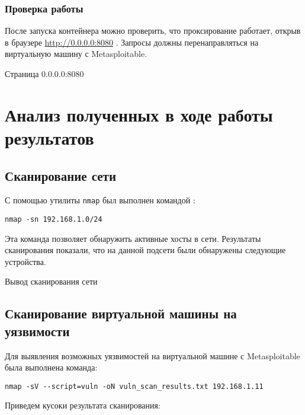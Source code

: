\subsubsection{Проверка работы}

После запуска контейнера можно проверить, что проксирование работает,
открыв в браузере \url{http://0.0.0.0:8080} .
Запросы должны перенаправляться на виртуальную машину с Metasploitable.

\begin{image}
    \caption{Страница 0.0.0.0:8080}
    \label{fig:modsec:web}
\end{image}

\section{Анализ полученных в ходе работы результатов}

\subsection{Сканирование сети}

С помощью утилиты \texttt{nmap} был выполнен командой :

\begin{verbatim}
nmap -sn 192.168.1.0/24
\end{verbatim}

Эта команда позволяет обнаружить активные хосты в сети.
Результаты сканирования показали,
что на данной подсети были обнаружены следующие устройства.

\begin{image}
    \caption{Вывод сканирования сети}
    \label{fig:nmap:sn}
\end{image}

\subsection{Сканирование виртуальной машины на уязвимости}

Для выявления возможных уязвимостей на виртуальной машине с Metasploitable
была выполнена команда:

\begin{verbatim}
nmap -sV --script=vuln -oN vuln_scan_results.txt 192.168.1.11
\end{verbatim}

Приведем кусоки результата сканирования:

